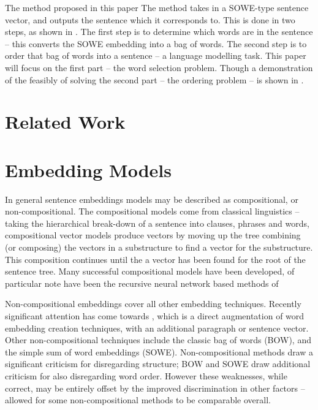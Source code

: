 \documentclass[]{scrartcl}
\numberwithin{equation}{section}
\numberwithin{figure}{section}
\theoremstyle{plain}
\theoremstyle{definition}
\begin{document}
The method proposed in this paper The method takes in a SOWE-type sentence vector, and outputs the sentence which it corresponds to.
This is done in two steps, as shown in .
The first step is to determine which words are in the sentence -- this converts the SOWE embedding into a bag of words.
The second step is to order that bag of words into a sentence -- a language modelling task.
This paper will focus on the first part -- the word selection problem. 
Though a demonstration of the feasibly of solving the second part -- the ordering problem --  is shown in .


\section{Related Work}

\section{Embedding Models}
In general sentence embeddings models may be described as compositional, or non-compositional.
The compositional models come from classical linguistics -- taking the hierarchical  break-down of a sentence into clauses, phrases and words, compositional vector models produce vectors by moving up the tree combining (or composing) the vectors in a substructure to find a vector for the substructure. This composition continues until the a vector has been found for the root of the sentence tree. Many successful compositional models have been developed, of particular note have been the recursive neural network based methods of  \cite{socher2010PhraseEmbedding}%

Non-compositional embeddings cover all other embedding techniques. Recently significant attention has come towards  \cite{le2014distributed}, which is a direct augmentation of word embedding creation techniques, with an additional paragraph or sentence vector. Other non-compositional techniques include the classic bag of words (BOW), and the simple sum of word embeddings (SOWE). Non-compositional methods draw a significant criticism for disregarding structure; BOW and SOWE draw additional criticism for also disregarding word order. However these weaknesses, while correct, may be entirely offset by the improved discrimination in other factors -- allowed for some non-compositional methods to be comparable overall. 
\end{document}
